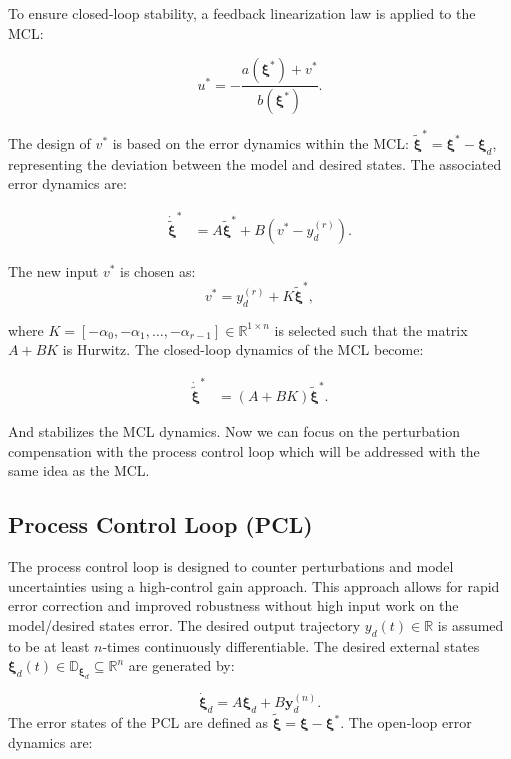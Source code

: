 To ensure closed-loop stability, a feedback linearization law is applied to the MCL:

\begin{equation}
    \label{eq:MCL_control_law}
    u^* = -\frac{a(\boldsymbol{\xi}^*) + v^*}{b(\boldsymbol{\xi}^*)}.
\end{equation}

The design of \(v^*\) is based on the error dynamics within the MCL: \(\tilde{\boldsymbol{\xi}}^* = \boldsymbol{\xi}^* - \boldsymbol{\xi}_d\), 
representing the deviation between the model and desired states. The associated error dynamics are:

\begin{align}
    \dot{\tilde{\boldsymbol{\xi}}}^* &= A\tilde{\boldsymbol{\xi}}^* + B(v^* - y_d^{(r)}).
\end{align}

The new input \(v^*\) is chosen as:
\begin{equation}
    v^* = y_d^{(r)} + K\tilde{\boldsymbol{\xi}}^*,
\end{equation}

where \(K = [-\alpha_0, -\alpha_1, \ldots, -\alpha_{r-1}] \in \mathbb{R}^{1 \times n}\) is selected 
such that the matrix \(A + BK\) is Hurwitz. The closed-loop dynamics of the MCL become:

\begin{align}
    \dot{\tilde{\boldsymbol{\xi}}}^* &= (A + BK)\tilde{\boldsymbol{\xi}}^*.
\end{align}

And stabilizes the MCL dynamics. Now we can focus on the perturbation compensation with the process control loop
which will be addressed with the same idea as the MCL.

\subsection{Process Control Loop (PCL)}
The process control loop is designed to counter perturbations and model uncertainties using a high-control 
gain approach. This approach allows for rapid error correction and improved robustness without high input 
work on the model/desired states error. The desired output trajectory \(y_d(t) \in \mathbb{R}\) is assumed 
to be at least \(n\)-times continuously differentiable. The desired external 
states \(\boldsymbol{\xi}_d(t) \in \mathbb{D}_{\boldsymbol{\xi}_d} \subseteq \mathbb{R}^n\) are generated by:


\begin{equation}
    \dot{\boldsymbol{\xi}}_d = A\boldsymbol{\xi}_d + B\boldsymbol{y}_d^{(n)}.
\end{equation}
The error states of the PCL are defined as \(\tilde{\boldsymbol{\xi}} = \boldsymbol{\xi} - \boldsymbol{\xi}^*\). The open-loop error dynamics are:


